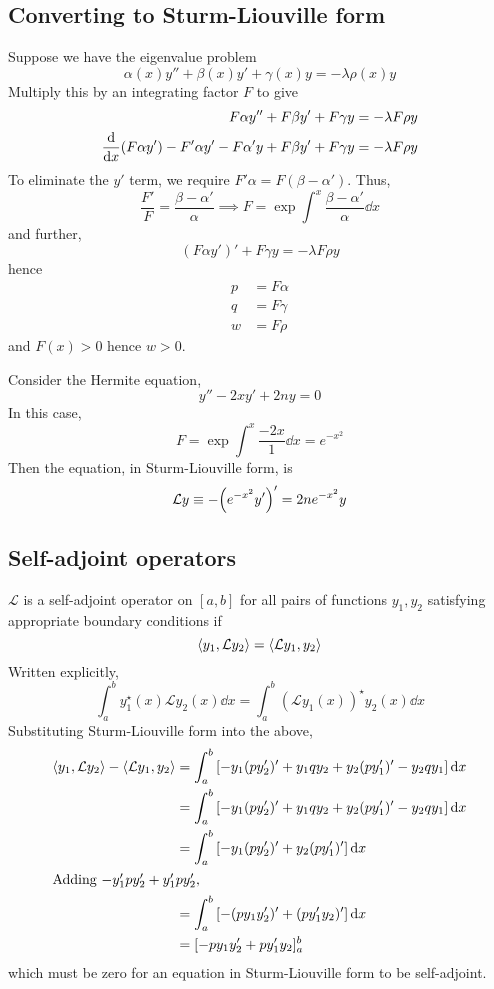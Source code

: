 \subsection{Converting to Sturm-Liouville form}
Suppose we have the eigenvalue problem
\[
	\alpha(x) y'' + \beta(x) y' + \gamma(x) y = -\lambda \rho(x) y
\]
Multiply this by an integrating factor \( F \) to give
\begin{align*}
	F \alpha y'' + F \beta y' + F \gamma y                                          & = -\lambda F \rho y \\
	\dv{x} \qty(F \alpha y') - F' \alpha y' - F \alpha' y + F \beta y' + F \gamma y & = -\lambda F \rho y
\end{align*}
To eliminate the \( y' \) term, we require \( F'\alpha = F(\beta - \alpha') \).
Thus,
\[
	\frac{F'}{F} = \frac{\beta - \alpha'}{\alpha} \implies F = \exp \int^x \frac{\beta - \alpha'}{\alpha} \dd{x}
\]
and further,
\[
	(F\alpha y')' + F \gamma y = - \lambda F \rho y
\]
hence
\begin{align*}
	p & = F \alpha \\
	q & = F \gamma \\
	w & = F \rho
\end{align*}
and \( F(x) > 0 \) hence \( w > 0 \).
\begin{example}
	Consider the Hermite equation,
	\[
		y'' - 2xy' + 2ny = 0
	\]
	In this case,
	\[
		F = \exp \int^x \frac{-2x}{1} \dd{x} = e^{-x^2}
	\]
	Then the equation, in Sturm-Liouville form, is
	\[
		\mathcal L y \equiv -\qty(e^{-x^2} y')' = 2n e^{-x^2} y
	\]
\end{example}

\subsection{Self-adjoint operators}
\( \mathcal L \) is a self-adjoint operator on \( [a,b] \) for all pairs of functions \( y_1,y_2 \) satisfying appropriate boundary conditions if
\[
	\left\langle{y_1, \mathcal L y_2}\right\rangle = \left\langle{\mathcal L y_1, y_2}\right\rangle
\]
Written explicitly,
\[
	\int_a^b y_1^\star(x) \mathcal L y_2(x) \dd{x} = \int_a^b (\mathcal L y_1(x))^\star y_2(x) \dd{x}
\]
Substituting Sturm-Liouville form into the above,
\begin{align*}
	\left\langle{y_1, \mathcal L y_2}\right\rangle - \left\langle{\mathcal L y_1, y_2}\right\rangle & = \int_a^b \qty[-y_1 (py_2')' + y_1 q y_2 + y_2 (p y_1')' - y_2 q y_1] \dd{x} \\
	                                                          & = \int_a^b \qty[-y_1 (py_2')' + y_1 q y_2 + y_2 (p y_1')' - y_2 q y_1] \dd{x} \\
	                                                          & = \int_a^b \qty[-y_1 (py_2')' + y_2 (p y_1')'] \dd{x}                         \\
	\intertext{Adding \( -y_1' p y_2' + y_1' p y_2' \),}
	                                                          & = \int_a^b \qty[-(py_1y_2')' + (py_1'y_2)'] \dd{x}                            \\
	                                                          & = [-py_1y_2' + py_1'y_2]_a^b
\end{align*}
which must be zero for an equation in Sturm-Liouville form to be self-adjoint.

